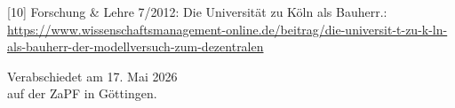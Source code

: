 \documentclass[DIV=calc]{scrartcl}
\begin{document}
 {[10]} Forschung \& Lehre 7/2012: Die Universität zu Köln als Bauherr.:
 \url{https://www.wissenschaftsmanagement-online.de/beitrag/die-universit-t-zu-k-ln-als-bauherr-der-modellversuch-zum-dezentralen}




\vspace{1cm} 
%
\vfill
\begin{flushright}
	Verabschiedet am 17. Mai 2026 \\
	auf der ZaPF in Göttingen.
\end{flushright}
\end{document}
